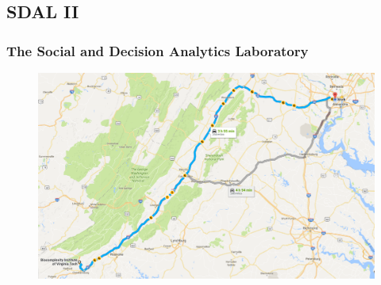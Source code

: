 \documentclass[compress]{beamer}
\begin{document}
\subsection[SDAL II]{SDAL II}
    \begin{frame}[Basic2] \frametitle{The Social and Decision Analytics Laboratory}
        \begin{figure}
            \centering
            \includegraphics[height=0.75\textheight]{../figures/sdal_google_maps}
            \label{fig:sdalgooglemaps}
        \end{figure}
    \end{frame}
\end{document}
